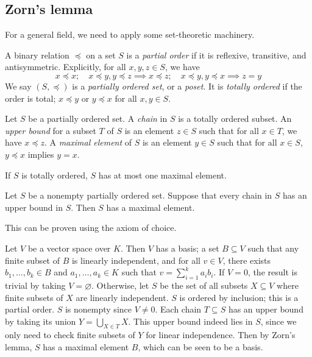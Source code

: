 \subsection{Zorn's lemma}
For a general field, we need to apply some set-theoretic machinery.
\begin{definition}
	A binary relation \( \preceq \) on a set \( S \) is a \emph{partial order} if it is reflexive, transitive, and antisymmetric.
	Explicitly, for all \( x, y, z \in S \), we have
	\[ x \preceq x;\quad x \preceq y, y \preceq z \implies x \preceq z;\quad x \preceq y, y \preceq x \implies z = y \]
	We say \( (S, \preceq) \) is a \emph{partially ordered set}, or a \emph{poset}.
	It is \emph{totally ordered} if the order is total; \( x \preceq y \) or \( y \preceq x \) for all \( x, y \in S \).
\end{definition}
\begin{definition}
	Let \( S \) be a partially ordered set.
	A \emph{chain} in \( S \) is a totally ordered subset.
	An \emph{upper bound} for a subset \( T \) of \( S \) is an element \( z \in S \) such that for all \( x \in T \), we have \( x \preceq z \).
	A \emph{maximal element} of \( S \) is an element \( y \in S \) such that for all \( x \in S \), \( y \preceq x \) implies \( y = x \).
\end{definition}
If \( S \) is totally ordered, \( S \) has at most one maximal element.
\begin{lemma}[Zorn]
	Let \( S \) be a nonempty partially ordered set.
	Suppose that every chain in \( S \) has an upper bound in \( S \).
	Then \( S \) has a maximal element.
\end{lemma}
This can be proven using the axiom of choice.
\begin{example}
	Let \( V \) be a vector space over \( K \).
	Then \( V \) has a basis; a set \( B \subseteq V \) such that any finite subset of \( B \) is linearly independent, and for all \( v \in V \), there exists \( b_1, \dots, b_k \in B \) and \( a_1, \dots, a_k \in K \) such that \( v = \sum_{i=1}^k a_i b_i \).
	If \( V = {0} \), the result is trivial by taking \( V = \varnothing \).
	Otherwise, let \( S \) be the set of all subsets \( X \subseteq V \) where finite subsets of \( X \) are linearly independent.
	\( S \) is ordered by inclusion; this is a partial order.
	\( S \) is nonempty since \( V \neq {0} \).
	Each chain \( T \subseteq S \) has an upper bound by taking its union \( Y = \bigcup_{X \in T} X \).
	This upper bound indeed lies in \( S \), since we only need to check finite subsets of \( Y \) for linear independence.
	Then by Zorn's lemma, \( S \) has a maximal element \( B \), which can be seen to be a basis.
\end{example}
